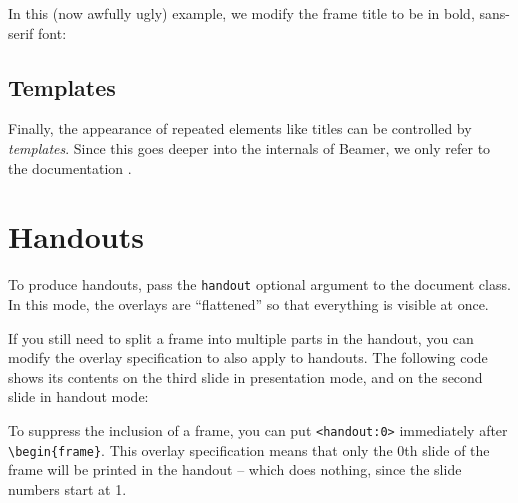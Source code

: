 In this (now awfully ugly) example,
we modify the frame title to be in bold, sans-serif font:
\begin{ExampleCode}
\end{ExampleCode}
%
\begin{center}
\end{center}



%
%
\subsection{Templates}\label{sec:beamer templates}

Finally, the appearance of repeated elements like titles can be controlled by \emph{templates}.
Since this goes deeper into the internals of Beamer,
we only refer to the documentation \cite[Section~16.3]{beamer}.



%
%
\section{Handouts}

To produce handouts, pass the \verb|handout| optional argument to the document class.
In this mode, the overlays are ``flattened'' so that everything is visible at once.

If you still need to split a frame into multiple parts in the handout,
you can modify the overlay specification to also apply to handouts.
The following code shows its contents on the third slide in presentation mode,
and on the second slide in handout mode:
\begin{ExampleCode}
\end{ExampleCode}

To suppress the inclusion of a frame,
you can put \verb|<handout:0>| immediately after \verb|\begin{frame}|.
This overlay specification means that only the 0th slide of the frame will be printed in the handout
-- which does nothing, since the slide numbers start at 1.

